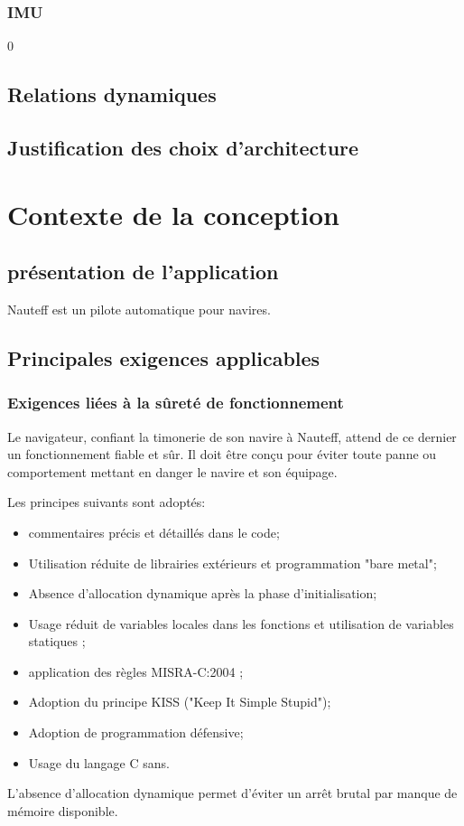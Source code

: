 \documentclass[a4paper,11pt]{report}
\begin{document}
\subsection{IMU}
0
\section{Relations dynamiques}


\section{Justification des choix d'architecture}

\chapter{Contexte de la conception}
\section{présentation de l'application}
Nauteff est un pilote automatique pour navires.
\section{Principales exigences applicables}
\subsection{Exigences liées à la sûreté de fonctionnement}
Le navigateur, confiant la timonerie de son navire à Nauteff,
attend de ce dernier un fonctionnement fiable et sûr.
Il doit être conçu pour éviter toute panne ou
comportement mettant en danger le navire et son équipage.

Les principes suivants sont adoptés:
\begin{itemize}
    \item commentaires précis et détaillés dans le code;
    \item Utilisation réduite de librairies extérieurs et programmation "bare metal";
    
	\item Absence d'allocation dynamique après la phase d'initialisation;
	\item Usage réduit de variables locales dans les fonctions et utilisation de variables statiques ;
	\item application des règles MISRA-C:2004 \cite{MISRAC};
	\item Adoption du principe KISS ("Keep It Simple Stupid");
    \item Adoption de programmation défensive;
    \item Usage du langage C sans.
\end{itemize}
L'absence d'allocation dynamique permet d'éviter un arrêt brutal par
manque de mémoire disponible. 
\end{document}
